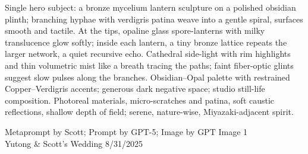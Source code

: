 \documentclass[12pt]{article}
\begin{document}
\noindent
\begin{adjustbox}{max size={\textwidth}{\textheight}}
\begin{varwidth}{\textwidth}
\RaggedRight
\footnotesize
Single hero subject: a bronze mycelium lantern sculpture on a polished obsidian plinth; branching hyphae with verdigris patina weave into a gentle spiral, surfaces smooth and tactile. At the tips, opaline glass spore-lanterns with milky translucence glow softly; inside each lantern, a tiny bronze lattice repeats the larger network, a quiet recursive echo. Cathedral side-light with rim highlights and thin volumetric mist like a breath tracing the paths; faint fiber-optic glints suggest slow pulses along the branches. Obsidian–Opal palette with restrained Copper–Verdigris accents; generous dark negative space; studio still-life composition. Photoreal materials, micro-scratches and patina, soft caustic reflections, shallow depth of field; serene, nature-wise, Miyazaki-adjacent spirit.
\end{varwidth}
\end{adjustbox}
\vfill
{\raggedleft\footnotesize
Metaprompt by Scott; Prompt by GPT-5; Image by GPT Image 1 \\
Yutong \& Scott's Wedding 8/31/2025\par}
\end{document}
